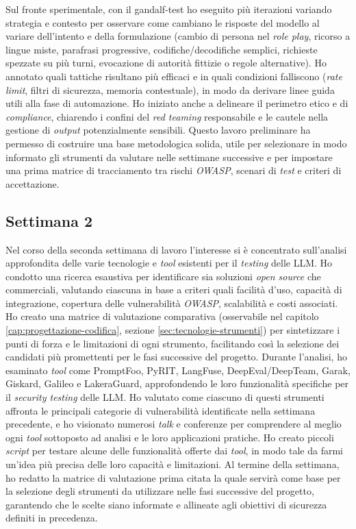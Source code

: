 Sul fronte sperimentale, con il \gls{gandalf-test} ho eseguito più iterazioni variando strategia e contesto per osservare come cambiano le risposte del modello al variare dell'intento e della formulazione (cambio di persona nel \emph{role play}, ricorso a lingue miste, parafrasi progressive, codifiche/decodifiche semplici, richieste spezzate su più turni, evocazione di autorità fittizie o regole alternative). Ho annotato quali tattiche risultano più efficaci e in quali condizioni falliscono (\emph{rate limit}, filtri di sicurezza, memoria contestuale), in modo da derivare linee guida utili alla fase di automazione. Ho iniziato anche a delineare il perimetro etico e di \emph{compliance}, chiarendo i confini del \emph{red teaming} responsabile e le cautele nella gestione di \emph{output} potenzialmente sensibili. Questo lavoro preliminare ha permesso di costruire una base metodologica solida, utile per selezionare in modo informato gli strumenti da valutare nelle settimane successive e per impostare una prima matrice di tracciamento tra rischi \emph{OWASP}, scenari di \emph{test} e criteri di accettazione.
\newpage
\subsection{Settimana 2}
Nel corso della seconda settimana di lavoro l'interesse si è concentrato sull'analisi approfondita delle varie tecnologie e \emph{tool} esistenti per il \emph{testing} delle LLM. Ho condotto una ricerca esaustiva per identificare sia soluzioni \emph{open source} che commerciali, valutando ciascuna in base a criteri quali facilità d'uso, capacità di integrazione, copertura delle vulnerabilità \emph{OWASP}, scalabilità e costi associati. Ho creato una matrice di valutazione comparativa (osservabile nel capitolo \ref{cap:progettazione-codifica}, sezione \ref{sec:tecnologie-strumenti}) per sintetizzare i punti di forza e le limitazioni di ogni strumento, facilitando così la selezione dei candidati più promettenti per le fasi successive del progetto. Durante l'analisi, ho esaminato \emph{tool} come PromptFoo, PyRIT, LangFuse, DeepEval/DeepTeam, Garak, Giskard, Galileo e LakeraGuard, approfondendo le loro funzionalità specifiche per il \emph{security testing} delle LLM. Ho valutato come ciascuno di questi strumenti affronta le principali categorie di vulnerabilità identificate nella settimana precedente, e ho visionato numerosi \emph{talk} e conferenze per comprendere al meglio ogni \emph{tool} sottoposto ad analisi e le loro applicazioni pratiche. Ho creato piccoli \emph{script} per testare alcune delle funzionalità offerte dai \emph{tool}, in modo tale da farmi un'idea più precisa delle loro capacità e limitazioni. Al termine della settimana, ho redatto la matrice di valutazione prima citata la quale servirà come base per la selezione degli strumenti da utilizzare nelle fasi successive del progetto, garantendo che le scelte siano informate e allineate agli obiettivi di sicurezza definiti in precedenza.

